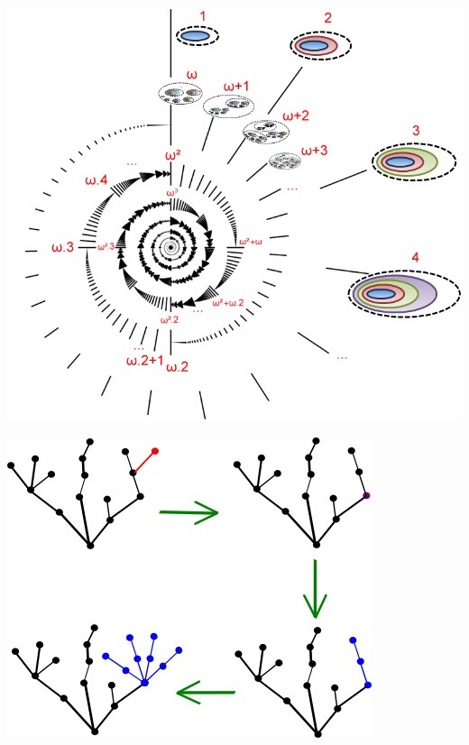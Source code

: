\documentclass{uebblatt}
\begin{document}
\begin{center}
  \begin{minipage}{0.55\textwidth}
    \href{http://naturelovesmath-en.blogspot.de/2012/07/infinity-and-transfinite-numbers.html}{
      \includegraphics[scale=0.4]{images/ordinal-numbers}
    }
  \end{minipage}
  \qquad
  \begin{minipage}{0.30\textwidth}
    \includegraphics[scale=0.5]{images/hydra}
  \end{minipage}
\end{center}
\end{document}

